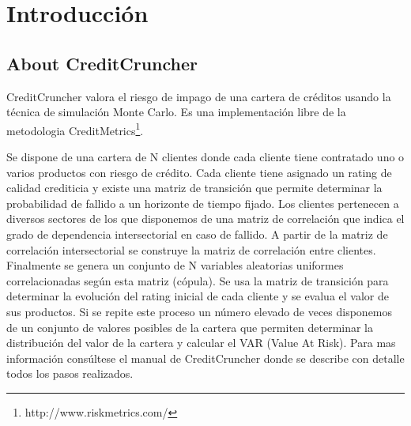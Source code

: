 
%
%
%
%
%
%
%
%

\chapter{Introducci\'on}
\label{sec:introduction}

\section{About CreditCruncher}

CreditCruncher valora el riesgo de impago de una cartera de cr\'editos usando la 
t\'ecnica de simulaci\'on Monte Carlo. Es una implementaci\'on libre de la metodologia
CreditMetrics\footnote{http://www.riskmetrics.com/}. 

Se dispone de una cartera de N clientes donde cada cliente tiene contratado uno o 
varios productos con riesgo de cr\'edito. Cada cliente tiene asignado un rating de 
calidad crediticia y existe una matriz de transici\'on que permite determinar la 
probabilidad de fallido a un horizonte de tiempo fijado. Los clientes pertenecen 
a diversos sectores de los que disponemos de una matriz de correlaci\'on que 
indica el grado de dependencia intersectorial en caso de fallido. A partir de 
la matriz de correlaci\'on intersectorial se construye la matriz de correlaci\'on 
entre clientes. Finalmente se genera un conjunto de N variables aleatorias 
uniformes correlacionadas seg\'un esta matriz (c\'opula). Se usa la matriz de 
transici\'on para determinar la evoluci\'on del rating inicial de cada cliente y se 
evalua el valor de sus productos. Si se repite este proceso un n\'umero elevado de 
veces disponemos de un conjunto de valores posibles de la cartera que permiten 
determinar la distribuci\'on del valor de la cartera y calcular el VAR (Value At Risk). 
Para mas informaci\'on cons\'ultese el manual de CreditCruncher donde se describe 
con detalle todos los pasos realizados.\cite{Ait-83,Cum-97}

